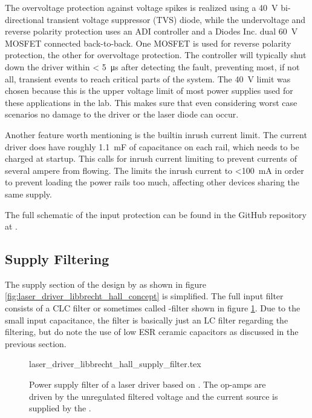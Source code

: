 The overvoltage protection against voltage spikes is realized using a  \cite{datasheet_SMBJ-Q} \qty{40}{\V} bi-directional transient voltage suppressor (TVS) diode, while the undervoltage and reverse polarity protection uses an ADI  \cite{datasheet_LTC4365} controller and a Diodes Inc.  \cite{datasheet_DMN6040SSD} dual \qty{60}{\V} MOSFET connected back-to-back. One MOSFET is used for reverse polarity protection, the other for overvoltage protection. The  controller will typically shut down the driver within \qty{< 5}{\us} after detecting the fault, preventing most, if not all, transient events to reach critical parts of the system. The \qty{40}{\V} limit was chosen because this is the upper voltage limit of most power supplies used for these applications in the lab. This makes sure that even considering worst case scenarios no damage to the driver or the laser diode can occur.

Another feature worth mentioning is the builtin inrush current limit. The current driver does have roughly \qty{1.1}{\milli\F} of capacitance on each rail, which needs to be charged at startup. This calls for inrush current limiting to prevent currents of several ampere from flowing. The  limits the inrush current to \qty{<100}{\mA} in order to prevent loading the power rails too much, affecting other devices sharing the same supply.

The full schematic of the input protection can be found in the GitHub repository at \cite{git_dgDrive}.

\subsection{Supply Filtering}
\label{sec:supply_filtering}
The supply section of the design by \citeauthor{libbrecht_hall} \cite{libbrecht_hall} as shown in figure \ref{fig:laser_driver_libbrecht_hall_concept} is simplified. The full input filter consists of a CLC filter or sometimes called \pi-filter shown in figure \ref{fig:laser_driver_libbrecht_hall_filter}. Due to the small input capacitance, the filter is basically just an LC filter regarding the filtering, but do note the use of low ESR ceramic capacitors as discussed in the previous section.
\begin{figure}[ht]
    \centering
        {laser_driver_libbrecht_hall_supply_filter.tex}
    \caption{Power supply filter of a laser driver based on \cite{libbrecht_hall}. The op-amps are driven by the unregulated filtered voltage and the current source is supplied by the .}
    \label{fig:laser_driver_libbrecht_hall_filter}
\end{figure}

